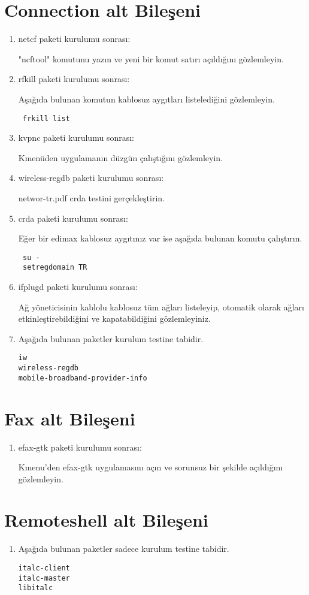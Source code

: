 \documentclass[a4paper,10pt]{article}
\begin{document}
\section{Connection alt Bileşeni}
\begin{enumerate}
\item netcf paketi kurulumu sonrası:

 "ncftool" komutunu yazın ve yeni bir komut satırı açıldığını gözlemleyin.

\item rfkill paketi kurulumu sonrası:

Aşağıda bulunan komutun kablosuz aygıtları listelediğini gözlemleyin.
\begin{verbatim}
 frkill list
\end{verbatim}


\item kvpnc paketi kurulumu sonrası:

Kmenüden uygulamanın düzgün çalıştığını gözlemleyin.
\item wireless-regdb paketi kurulumu sonrası:

networ-tr.pdf crda testini gerçekleştirin.
\item crda paketi kurulumu sonrası:

Eğer bir edimax kablosuz aygıtınız var ise aşağıda bulunan komutu çalıştırın.
\begin{verbatim}
 su -
 setregdomain TR
\end{verbatim}

\item ifplugd paketi kurulumu sonrası:

Ağ yöneticisinin kablolu kablosuz tüm ağları listeleyip, otomatik olarak ağları etkinleştirebildiğini ve kapatabildiğini gözlemleyiniz.

 \item Aşağıda bulunan paketler kurulum testine tabidir.
\begin{verbatim}
iw
wireless-regdb
mobile-broadband-provider-info
\end{verbatim}

\end{enumerate}

\section{Fax alt Bileşeni}
\begin{enumerate}
 \item efax-gtk paketi kurulumu sonrası:

Kmenu'den efax-gtk uygulamasını açın ve sorunsuz bir şekilde açıldığını gözlemleyin.
\end{enumerate}

\section{Remoteshell alt Bileşeni}
\begin{enumerate}
 \item Aşağıda bulunan paketler sadece kurulum testine tabidir.

\begin{verbatim}
italc-client
italc-master
libitalc
\end{verbatim}

\end{enumerate}
\end{document}
